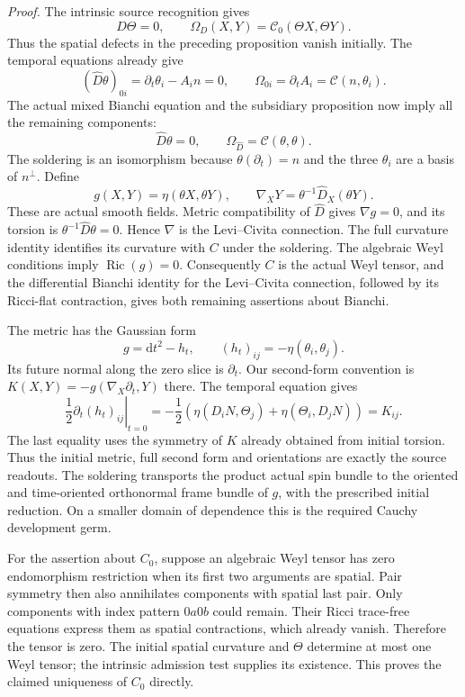 \documentclass[
  english,
  11pt,
  reqno]{amsart}
\begin{document}
\emph{Proof.} The intrinsic source recognition gives%
 \[
D\Theta=0,\qquad
\Omega_D(X,Y)=\mathcal C_0(\Theta X,\Theta Y).
\] Thus the spatial defects in the preceding proposition vanish
initially. The temporal equations already give \[
(\widehat D\theta)_{0i}
=\partial_t\theta_i-A_i n=0,
\qquad
\Omega_{0i}
=\partial_t A_i=\mathcal C(n,\theta_i).
\] The actual mixed Bianchi equation and the subsidiary proposition now
imply all the remaining components:%
 \[
\widehat D\theta=0,
\qquad
\Omega_{\widehat D}=\mathcal C(\theta,\theta).
\] The soldering is an isomorphism because \(\theta(\partial_t)=n\) and
the three \(\theta_i\) are a basis of \(n^\perp\). Define%
\[
g(X,Y)=\eta(\theta X,\theta Y),
\qquad
\nabla_XY=\theta^{-1}\widehat D_X(\theta Y).
\] These are actual smooth fields. Metric compatibility of
\(\widehat D\) gives \(\nabla g=0\), and its torsion is
\(\theta^{-1}\widehat D\theta=0\). Hence \(\nabla\) is the Levi--Civita
connection. The full curvature identity identifies its curvature with
\(C\) under the soldering. The algebraic Weyl conditions imply
\(\operatorname{Ric}(g)=0\). Consequently \(C\) is the actual Weyl
tensor, and the differential Bianchi identity for the Levi--Civita
connection, followed by its Ricci-flat contraction, gives both remaining
assertions about Bianchi.

The metric has the Gaussian form%
 \[
g=\mathrm dt^2-h_t,
\qquad
(h_t)_{ij}=-\eta(\theta_i,\theta_j).
\] Its future normal along the zero slice is \(\partial_t\). Our
second-form convention is \(K(X,Y)=-g(\nabla_X\partial_t,Y)\) there. The
temporal equation gives%
 \[
\left.\frac12\partial_t(h_t)_{ij}\right|_{t=0}
=-\frac12\left(
\eta(D_iN,\Theta_j)+\eta(\Theta_i,D_jN)
\right)
=K_{ij}.
\] The last equality uses the symmetry of \(K\) already obtained from
initial torsion. Thus the initial metric, full second form and
orientations are exactly the source readouts. The soldering transports
the product actual spin bundle to the oriented and time-oriented
orthonormal frame bundle of \(g\), with the prescribed initial
reduction. On a smaller domain of dependence this is the required Cauchy
development germ.

For the assertion about \(C_0\), suppose an algebraic Weyl tensor has
zero endomorphism restriction when its first two arguments are spatial.
Pair symmetry then also annihilates components with spatial last pair.
Only components with index pattern \(0a0b\) could remain. Their Ricci
trace-free equations express them as spatial contractions, which already
vanish. Therefore the tensor is zero. The initial spatial curvature and
\(\Theta\) determine at most one Weyl tensor; the intrinsic admission
test supplies its existence. This proves the claimed uniqueness of
\(C_0\) directly.
\end{document}
